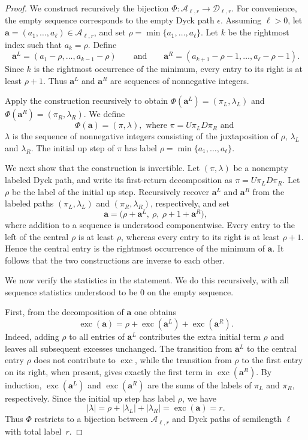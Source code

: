 \documentclass[10pt,a4paper]{amsart}
\begin{document}
\begin{proof}
  We construct recursively the bijection  $\Phi:\mathcal{A}_{\ell,r}\longrightarrow\mathcal{D}_{\ell,r}$.   For convenience, the empty sequence
corresponds to the empty Dyck path $\epsilon$. Assuming $\ell>0$, let $\mathbf{a}=(a_1,\ldots,a_\ell)\in\mathcal{A}_{\ell,r}$, and set $\rho=\min\{a_1,\ldots,a_\ell\}$. Let $k$ be the rightmost index such that $a_k=\rho$. Define
\[
\mathbf{a}^{L}
=
(a_1-\rho,\ldots,a_{k-1}-\rho) \qquad \text{and} \qquad 
\mathbf{a}^{R}
=
(a_{k+1}-\rho-1,\ldots,a_\ell-\rho-1).
\]
Since $k$ is the rightmost occurrence of the minimum, every entry to its
right is at least $\rho+1$. Thus $\mathbf{a}^{L}$ and
$\mathbf{a}^{R}$ are sequences of nonnegative integers.



  Apply the construction recursively to obtain $\Phi(\mathbf{a}^{L})=(\pi_L,\lambda_L)$ and $\Phi(\mathbf{a}^{R})=(\pi_R,\lambda_R)$. We define
\[
\Phi(\mathbf{a})=(\pi,\lambda),
 \text{ where } 
\pi=U\pi_LD\pi_R \text{ and } 
\]
$\lambda$ is the sequence of nonnegative integers consisting of the juxtaposition of $\rho$, $\lambda_L$ and $\lambda_R$.
 The initial up step of
$\pi$ has label $\rho=\min\{a_1,\ldots,a_\ell\}$.

We next show that the construction is invertible. Let $(\pi,\lambda)$ be
a nonempty labeled Dyck path, and write its first-return decomposition as $\pi=U\pi_LD\pi_R$. Let $\rho$ be the label of the initial up step. Recursively recover
$\mathbf{a}^{L}$ and $\mathbf{a}^{R}$ from the labeled paths
$(\pi_L,\lambda_L)$ and $(\pi_R,\lambda_R)$, respectively, and set
\[
\mathbf{a}
=
\bigl(
\rho+\mathbf{a}^{L},
\ \rho,\
\rho+1+\mathbf{a}^{R}
\bigr),
\]
where addition to a sequence is understood componentwise. Every entry to the
left of the central $\rho$ is at least $\rho$, whereas every entry to its
right is at least $\rho+1$. Hence the central entry is the rightmost
occurrence of the minimum of $\mathbf{a}$. It follows that the two
constructions are inverse to each other.

We now verify the statistics in the statement. We do this recursively,
with all sequence statistics understood to be $0$ on the empty sequence.

First, from the decomposition of $\mathbf a$ one obtains
\[
\operatorname{exc}(\mathbf a)
=
\rho+\operatorname{exc}(\mathbf a^L)+\operatorname{exc}(\mathbf a^R).
\]
Indeed, adding $\rho$ to all entries of $\mathbf a^L$ contributes the extra initial term $\rho$
and leaves all subsequent excesses unchanged. The transition from $\mathbf a^L$ to the central
entry $\rho$ does not contribute to $\operatorname{exc}$, while the transition from
$\rho$ to the first entry on its right, when present, gives exactly the
first term in $\operatorname{exc}(\mathbf{a}^{R})$.  By induction,
$\operatorname{exc}(\mathbf{a}^{L})$ and
$\operatorname{exc}(\mathbf{a}^{R})$ are the sums of the labels of
$\pi_L$ and $\pi_R$, respectively. Since the initial up step has label
$\rho$, we have
\[
|\lambda|
=
\rho+|\lambda_L|+|\lambda_R|
=
\operatorname{exc}(\mathbf{a})
=
r.
\]
Thus $\Phi$ restricts to a bijection between $\mathcal{A}_{\ell,r}$ and
Dyck paths of semilength $\ell$ with total label~$r$.


\end{proof}
\end{document}
